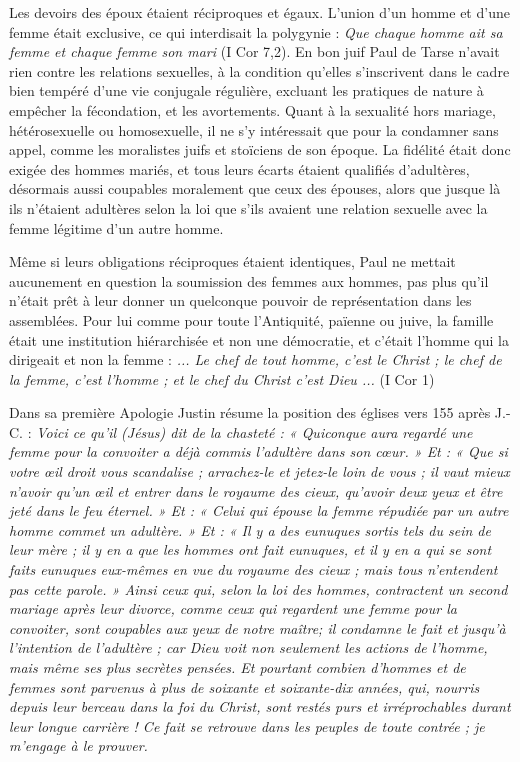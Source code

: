  Les devoirs des époux étaient réciproques et égaux. L'union d'un homme et d'une femme était exclusive, ce qui interdisait la polygynie : \emph{Que chaque homme ait sa femme et chaque femme son mari} (I Cor 7,2). En bon juif Paul de Tarse n'avait rien contre les relations sexuelles, à la condition qu'elles s'inscrivent dans le cadre bien tempéré d'une vie conjugale régulière, excluant les pratiques de nature à empêcher la fécondation, et les avortements. Quant à la sexualité hors mariage, hétérosexuelle ou homosexuelle, il ne s'y intéressait que pour la condamner sans appel, comme les moralistes juifs et stoïciens de son époque. La fidélité était donc exigée des hommes mariés, et tous leurs écarts étaient qualifiés d'adultères, désormais aussi coupables moralement que ceux des épouses, alors que jusque là ils n'étaient adultères selon la loi que s'ils avaient une relation sexuelle avec la femme légitime d'un autre homme. 
 
 Même si leurs obligations réciproques étaient identiques, Paul ne mettait aucunement en question la soumission des femmes aux hommes, pas plus qu'il n'était prêt à leur donner un quelconque pouvoir de représentation dans les assemblées. Pour lui comme pour toute l'Antiquité, païenne ou juive, la famille était une institution hiérarchisée et non une démocratie, et c'était l'homme qui la dirigeait et non la femme : \emph{... Le chef de tout homme, c'est le Christ ; le chef de la femme, c'est l'homme ; et le chef du Christ c'est Dieu ...} (I Cor 1) 

 Dans sa première Apologie Justin résume la position des églises vers 155 après J.-C. : \emph{Voici ce qu'il \emph{(Jésus)} dit de la chasteté : « Quiconque aura regardé une femme pour la convoiter a déjà commis l'adultère dans son cœur. » Et : « Que si votre œil droit vous scandalise ; arrachez-le et jetez-le loin de vous ; il vaut mieux n'avoir qu'un œil et entrer dans le royaume des cieux, qu'avoir deux yeux et être jeté dans le feu éternel. » Et : « Celui qui épouse la femme répudiée par un autre homme commet un adultère. » Et : « Il y a des eunuques sortis tels du sein de leur mère ; il y en a que les hommes ont fait eunuques, et il y en a qui se sont faits eunuques eux-mêmes en vue du royaume des cieux ; mais tous n'entendent pas cette parole. » Ainsi ceux qui, selon la loi des hommes, contractent un second mariage après leur divorce, comme ceux qui regardent une femme pour la convoiter, sont coupables aux yeux de notre maître; il condamne le fait et jusqu'à l'intention de l'adultère ; car Dieu voit non seulement les actions de l'homme, mais même ses plus secrètes pensées. Et pourtant combien d'hommes et de femmes sont parvenus à plus de soixante et soixante-dix années, qui, nourris depuis leur berceau dans la foi du Christ, sont restés purs et irréprochables durant leur longue carrière ! Ce fait se retrouve dans les peuples de toute contrée ; je m'engage à le prouver.} 
 
